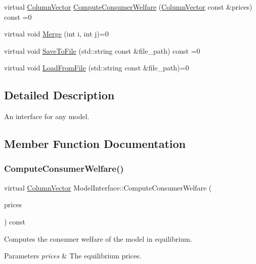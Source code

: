 \begin{DoxyCompactItemize}
\item 
virtual \hyperlink{classColumnVector}{Column\+Vector} \hyperlink{classModelInterface_a094ebb85618fb13bf38f6faff1f5dd7b}{Compute\+Consumer\+Welfare} (\hyperlink{classColumnVector}{Column\+Vector} const \&prices) const =0
\item 
virtual void \hyperlink{classModelInterface_a9aa52643da1fe9e74750e31a6c6ec469}{Merge} (int i, int j)=0
\item 
virtual void \hyperlink{classModelInterface_ab5709db8ecb96fd9efd02f4777d5502a}{Save\+To\+File} (std\+::string const \&file\+\_\+path) const =0
\item 
virtual void \hyperlink{classModelInterface_a7f408fdb15c10ce8cabf6b942bbc9c38}{Load\+From\+File} (std\+::string const \&file\+\_\+path)=0
\end{DoxyCompactItemize}


\subsection{Detailed Description}
An interface for any model. 

\subsection{Member Function Documentation}
\mbox{\label{classModelInterface_a094ebb85618fb13bf38f6faff1f5dd7b}} 
\subsubsection{\texorpdfstring{Compute\+Consumer\+Welfare()}{ComputeConsumerWelfare()}}
{\footnotesize\ttfamily virtual \hyperlink{classColumnVector}{Column\+Vector} Model\+Interface\+::\+Compute\+Consumer\+Welfare (\begin{DoxyParamCaption}\item[{\hyperlink{classColumnVector}{Column\+Vector} const \&}]{prices }\end{DoxyParamCaption}) const\hspace{0.3cm}{\ttfamily [pure virtual]}}

Computes the consumer welfare of the model in equilibrium.


\begin{DoxyParams}{Parameters}
{\em prices} & The equilibrium prices. \\
\hline
\end{DoxyParams}


